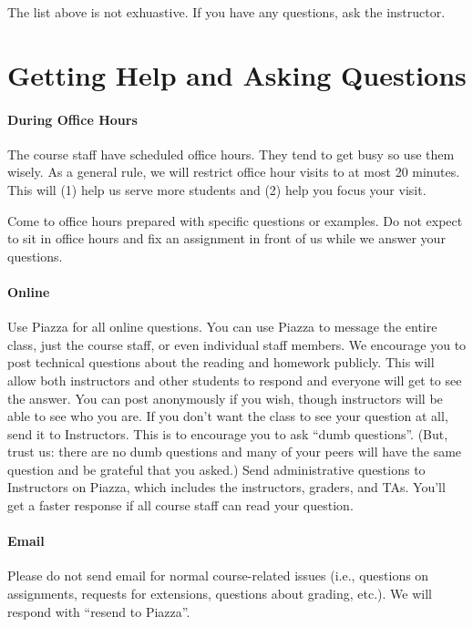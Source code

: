 \documentclass{article}
\begin{document}
The list above is not exhuastive. If you have any questions, ask the instructor.

\section{Getting Help and Asking Questions}

\paragraph{During Office Hours}

The course staff have scheduled office hours. They tend to get busy so use them
wisely. As a general rule, we will restrict office hour visits to at most 20
minutes. This will (1) help us serve more students and (2) help you focus your
visit.

Come to office hours prepared with specific questions or examples. Do not
expect to sit in office hours and fix an assignment in front of us while we
answer your questions.

\paragraph{Online}

Use Piazza for all online questions. You can use Piazza to message the entire
class, just the course staff, or even individual staff members.
We encourage you to post technical questions about the reading and homework
publicly. This will allow both instructors and other students to respond and
everyone will get to see the answer.
You can post anonymously if you wish, though instructors will be able to see
who you are. If you don't want the class to see your question at all, send it
to Instructors. This is to encourage you to ask ``dumb questions''. (But, trust
us: there are no dumb questions and many of your peers will have the same
question and be grateful that you asked.)
Send administrative questions to Instructors on Piazza, which includes the
instructors, graders, and TAs. You’ll get a faster response if all course staff
can read your question.

\paragraph{Email} Please do not send email for normal course-related issues
(i.e., questions on assignments, requests for extensions, questions about
grading, etc.). We will respond with ``resend to Piazza''.
\end{document}
